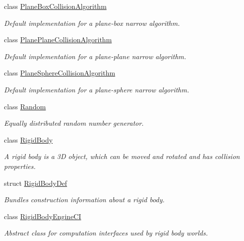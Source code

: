 \begin{DoxyCompactItemize}
class \mbox{\hyperlink{classr3_1_1_plane_box_collision_algorithm}{Plane\+Box\+Collision\+Algorithm}}
\begin{DoxyCompactList}\small\item\em Default implementation for a plane-\/box narrow algorithm. \end{DoxyCompactList}\item 
class \mbox{\hyperlink{classr3_1_1_plane_plane_collision_algorithm}{Plane\+Plane\+Collision\+Algorithm}}
\begin{DoxyCompactList}\small\item\em Default implementation for a plane-\/plane narrow algorithm. \end{DoxyCompactList}\item 
class \mbox{\hyperlink{classr3_1_1_plane_sphere_collision_algorithm}{Plane\+Sphere\+Collision\+Algorithm}}
\begin{DoxyCompactList}\small\item\em Default implementation for a plane-\/sphere narrow algorithm. \end{DoxyCompactList}\item 
class \mbox{\hyperlink{classr3_1_1_random}{Random}}
\begin{DoxyCompactList}\small\item\em Equally distributed random number generator. \end{DoxyCompactList}\item 
class \mbox{\hyperlink{classr3_1_1_rigid_body}{Rigid\+Body}}
\begin{DoxyCompactList}\small\item\em A rigid body is a 3D object, which can be moved and rotated and has collision properties. \end{DoxyCompactList}\item 
struct \mbox{\hyperlink{structr3_1_1_rigid_body_def}{Rigid\+Body\+Def}}
\begin{DoxyCompactList}\small\item\em Bundles construction information about a rigid body. \end{DoxyCompactList}\item 
class \mbox{\hyperlink{classr3_1_1_rigid_body_engine_c_i}{Rigid\+Body\+Engine\+CI}}
\begin{DoxyCompactList}\small\item\em Abstract class for computation interfaces used by rigid body worlds. \end{DoxyCompactList}\item 

\end{DoxyCompactItemize}

